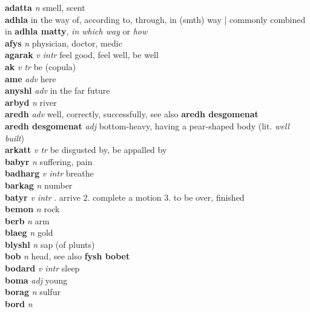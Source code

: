 \textbf{adatta}   \emph{n} \textperiodcentered smell, scent\\\textbf{adhla}    \textperiodcentered in the way of, according to, through, in (smth) way | commonly combined in \textbf{adhla matty}, \emph{in which way} or \emph{how}\\\textbf{afys}   \emph{n} \textperiodcentered physician, doctor, medic\\\textbf{agarak}   \emph{v intr} \textperiodcentered feel good, feel well, be well\\\textbf{ak}   \emph{v tr} \textperiodcentered be (copula)\\\textbf{ame}   \emph{adv} \textperiodcentered here\\\textbf{anyshl}   \emph{adv} \textperiodcentered in the far future\\\textbf{arbyd}   \emph{n} \textperiodcentered river\\\textbf{aredh}   \emph{adv} \textperiodcentered well, correctly, successfully, see also \textbf{aredh desgomenat}\\\textbf{aredh desgomenat}   \emph{adj} \textperiodcentered bottom-heavy, having a pear-shaped body (lit. \emph{well built})\\\textbf{arkatt}   \emph{v tr} \textperiodcentered be disgusted by, be appalled by\\\textbf{babyr}   \emph{n} \textperiodcentered suffering, pain\\\textbf{badharg}   \emph{v intr} \textperiodcentered breathe\\\textbf{barkag}   \emph{n} \textperiodcentered number\\\textbf{batyr}   \emph{v intr} . arrive 2. complete a motion 3. to be over, finished \\\textbf{bemon}   \emph{n} \textperiodcentered rock\\\textbf{berb}   \emph{n} \textperiodcentered arm\\\textbf{blaeg}   \emph{n} \textperiodcentered gold\\\textbf{blyshl}   \emph{n} \textperiodcentered sap (of plunts)\\\textbf{bob}   \emph{n} \textperiodcentered head, see also \textbf{fysh bobet}\\\textbf{bodard}   \emph{v intr} \textperiodcentered sleep\\\textbf{boma}   \emph{adj} \textperiodcentered young\\\textbf{borag}   \emph{n} \textperiodcentered sulfur\\\textbf{bord}   \emph{n} 